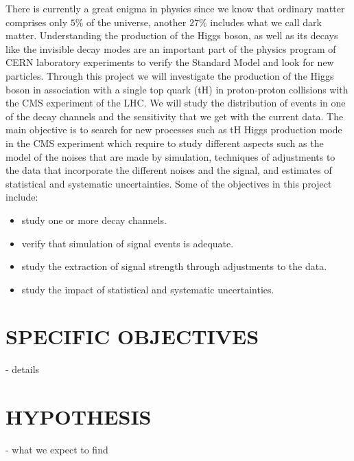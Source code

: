 \documentclass[final,3p]{CSP}
\begin{document}
There is currently a great enigma in physics since we know that ordinary matter comprises 
only $5\%$ of the universe, another 
$27\%$ includes what we call dark matter. Understanding the production of the Higgs boson, as 
well as its decays like the invisible decay modes are an important part of the physics 
program of CERN laboratory experiments to verify the Standard Model and look for new 
particles. Through this project we will investigate the production of the Higgs boson in 
association with a single top quark (tH) in proton-proton collisions with the CMS experiment 
of the LHC. We will study the distribution of events in one of the decay channels and the 
sensitivity that we get with the current data. The main objective is to search for new 
processes such as tH Higgs production mode in the CMS experiment which require to study 
different aspects such as the model of the noises that are made by simulation, techniques of 
adjustments to the data that incorporate the different noises and the signal, and estimates 
of statistical and systematic uncertainties.
Some of the objectives in this project include:\\
\begin{itemize}
\item study one or more decay channels.\\
\item verify that simulation of signal events is adequate.\\
\item study the extraction of signal strength through adjustments to the data.\\
\item study the impact of statistical and systematic uncertainties.\\
\end{itemize}

\section{SPECIFIC OBJECTIVES}
- details 

\section{HYPOTHESIS}
- what we expect to find\\
\end{document}
